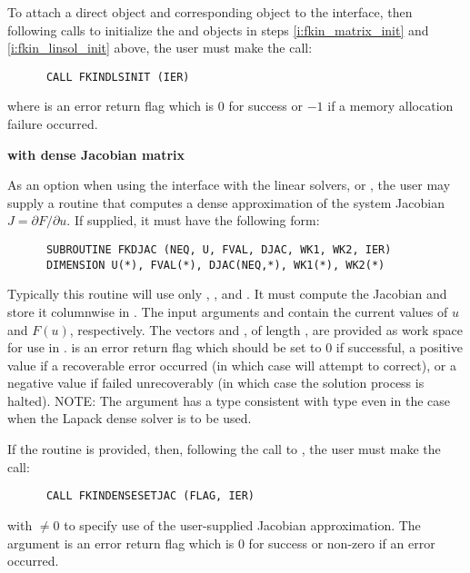 \begin{Steps}
  To attach a direct {\sunlinsol} object and corresponding
  {\sunmatrix} object to the {\kindls} interface, then following calls
  to initialize the {\sunlinsol} and {\sunmatrix} objects in steps
  \ref{i:fkin_matrix_init} and \ref{i:fkin_linsol_init} above, the user
  must make the call: 
\begin{verbatim}
      CALL FKINDLSINIT (IER)
\end{verbatim}
  where  is an error return flag which is $0$ for success or 
  $-1$ if a memory allocation failure occurred.

  {\bf {\kindls} with dense Jacobian matrix}

  As an option when using the {\kindls} interface with the {\sundials} 
  linear solvers, {\sunlinsoldense}
  or {\sunlinsollapdense}, the user may supply a
  routine that computes a dense approximation of the system Jacobian 
  $J = \partial F / \partial u$. If supplied, it must have the following form:
\begin{verbatim}
      SUBROUTINE FKDJAC (NEQ, U, FVAL, DJAC, WK1, WK2, IER)
      DIMENSION U(*), FVAL(*), DJAC(NEQ,*), WK1(*), WK2(*)
\end{verbatim}
  Typically this routine will use only , , and . 
  It must compute the Jacobian and store it columnwise in .
  The input arguments  and  contain the current
  values of $u$ and $F(u)$, respectively.
  The vectors  and ,
  of length , are provided as work space for use in .
   is an error return flag which should be set to $0$ if successful,
  a positive value if a recoverable error occurred (in which case {\kinsol}
  will attempt to correct), or a negative value if  failed
  unrecoverably (in which case the solution process is halted).
  NOTE: The argument  has a type consistent with {\CC} type 
  even in the case when the Lapack dense solver is to be used.

  If the  routine is provided, then, 
  following the call to , the user must make the call:
\begin{verbatim}
      CALL FKINDENSESETJAC (FLAG, IER)
\end{verbatim}
  with  $\neq 0$ to specify use of the user-supplied Jacobian
  approximation.  The argument  is an error return flag which is $0$ 
  for success or non-zero if an error occurred.


\end{Steps}
